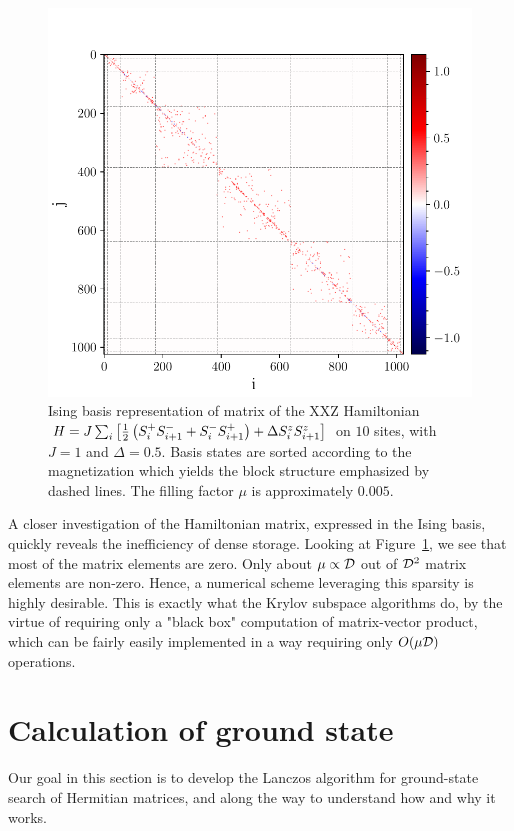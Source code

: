 \begin{figure}[H]
	\centering
	\includegraphics[width=0.7\linewidth]{Figures/matrix_elements.pdf}
	\caption{Ising basis representation of matrix of the XXZ Hamiltonian \(H = J\sum_{i} \left[\frac{1}{2}\left(S^{+}_i S^{-}_{i+1} +
	 S^{-}_{i}S^{+}_{i+1}\right) + \Delta S^{z}_i S^{z}_{i+1}\right]\) on \(10\) sites, with \(J = 1\) and \(\Delta=0.5\).
	Basis states are sorted according to the magnetization which yields the block structure emphasized by dashed lines.
	The filling factor \(\mu\) is approximately \(0.005\).}
	\label{fig:sparse_structure}
\end{figure}

 A closer investigation of the Hamiltonian matrix, expressed in the Ising basis,
 quickly reveals the inefficiency of dense storage. Looking at Figure~\ref{fig:sparse_structure}, we see that most of
 the matrix elements are zero. Only about \(\mu \propto \mathcal{D} \) out of \(\mathcal{D}^2\) matrix elements
 are non-zero. Hence, a numerical scheme leveraging this sparsity is highly desirable. This is exactly what the Krylov subspace algorithms
 do, by the virtue of requiring only a "black box" computation of matrix-vector product, which can be fairly easily implemented in a way
 requiring only \(O(\mu \mathcal{D})\) operations.

\section{Calculation of ground state}
Our goal in this section is to develop the Lanczos algorithm for ground-state search of Hermitian matrices, and along
the way to understand how and why it works.

